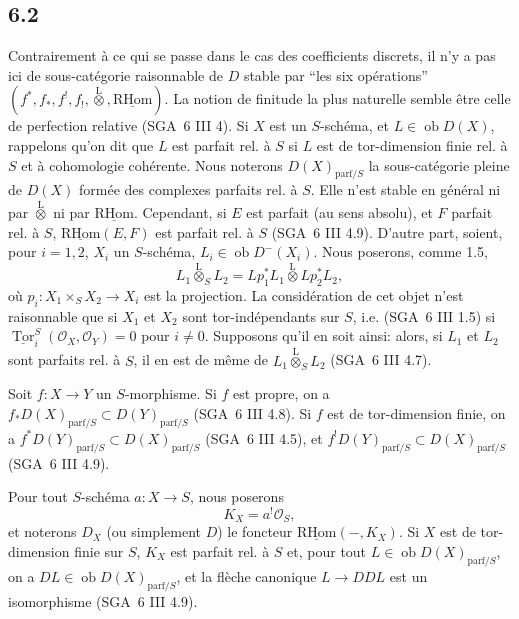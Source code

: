 \documentclass[11pt]{article}
\providecommand{\cO}{\mathcal{O}}
\DeclareMathOperator{\Tor}{Tor}
\newcommand{\R}{\mathrm{R}}\newcommand{\RHomCore}{\mathrm{RHom}}
\providecommand{\RHom}{\RHomCore}
\providecommand{\uRHom}{\underline{\RHom}}
\providecommand{\RHom}{\RHomCore}
\providecommand{\RHom}{\R\mathcal{H}om}
\providecommand{\R}{\mathrm R}
\providecommand{\RHom}{\RHomCore}
\begin{document}
\subsection*{6.2}
Contrairement à ce qui se passe dans le cas des coefficients discrets, il n'y a pas ici de sous-catégorie raisonnable de $D$ stable par ``les six opérations'' $(f^*,f_*,f^!,f_!,\overset{\mathrm{L}}{\otimes},\uRHom)$. La notion de finitude la plus naturelle semble être celle de perfection relative (SGA~6 III 4). Si $X$ est un $S$-schéma, et $L\in\operatorname{ob}D(X)$, 
rappelons qu'on dit que $L$ est parfait rel. à $S$ si $L$ est de tor-dimension finie rel. à $S$ et à
cohomologie cohérente. Nous noterons $D(X)_{\mathrm{parf}/S}$ la sous-catégorie pleine de $D(X)$ formée des complexes parfaits rel. à $S$. Elle n'est stable en général ni par $\overset{\mathrm{L}}{\otimes}$ ni par $\uRHom$. Cependant, si $E$ est parfait (au sens absolu), et $F$ parfait rel. à $S$, $\uRHom(E,F)$ est parfait rel. à $S$ (SGA~6 III 4.9). D'autre part, soient, pour $i=1,2$, $X_i$ un $S$-schéma, $L_i\in\operatorname{ob}D^{-}(X_i)$. Nous poserons, comme 1.5,
\[
L_1\overset{\mathrm{L}}{\otimes}_SL_2=Lp_1^*L_1\overset{\mathrm{L}}{\otimes}Lp_2^*L_2,
\]
où $p_i:X_1\times_SX_2\to X_i$ est la projection. La considération de cet objet n'est raisonnable que si $X_1$ et $X_2$ sont tor-indépendants sur $S$, i.e. (SGA~6 III 1.5) si $\underline{\Tor}_i^S(\cO_X,\cO_Y)=0$ pour $i\ne0$. Supposons qu'il en soit ainsi: alors, si $L_1$ et $L_2$ sont parfaits rel. à $S$, il en est de même de $L_1\overset{\mathrm{L}}{\otimes}_SL_2$ (SGA~6 III 4.7).

Soit $f:X\to Y$ un $S$-morphisme. Si $f$ est propre, on a $f_*D(X)_{\mathrm{parf}/S}\subset D(Y)_{\mathrm{parf}/S}$ (SGA~6 III 4.8). Si $f$ est de tor-dimension finie, on a $f^*D(Y)_{\mathrm{parf}/S}\subset D(X)_{\mathrm{parf}/S}$ (SGA~6 III 4.5), et $f^!D(Y)_{\mathrm{parf}/S}\subset D(X)_{\mathrm{parf}/S}$ (SGA~6 III 4.9).

Pour tout $S$-schéma $a:X\to S$, nous poserons
\begin{equation}
\tag{6.2.1}
K_X=a^!\cO_S,
\end{equation}
et noterons $D_X$ (ou simplement $D$) le foncteur $\uRHom(-,K_X)$. Si $X$ est de tor-dimension finie sur $S$, $K_X$ est parfait rel. à $S$ et, pour tout $L\in\operatorname{ob}D(X)_{\mathrm{parf}/S}$, on a $DL\in\operatorname{ob}D(X)_{\mathrm{parf}/S}$, et la flèche canonique $L\to DDL$ est un isomorphisme (SGA~6 III 4.9).
\end{document}
